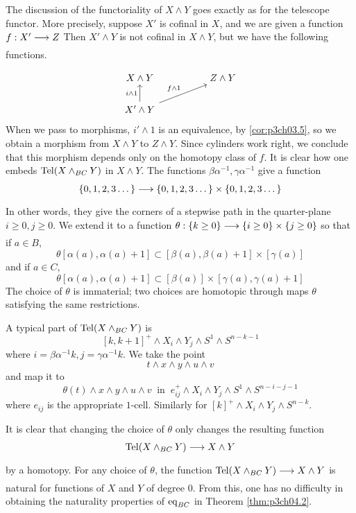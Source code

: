 \documentclass[../main]{subfiles}
\begin{document}
The discussion of the functoriality of $X\wedge Y$ goes exactly as for the telescope functor. More precisely, suppose $X'$ is cofinal in $X$, and we are given a function $f:X'\lar{}Z$ Then $X'\wedge Y$ is not cofinal in $X\wedge Y$, but we have the following functions.

\[\begin{tikzcd}
X\wedge Y && Z\wedge Y\\ X'\wedge Y \arrow[u,"i\wedge 1"] \arrow[urr, "f\wedge 1"]
\end{tikzcd}\]
When we pass to morphisms, $i'\wedge 1$ is an equivalence, by \ref{cor:p3ch03.5}, so we obtain a morphism from $X\wedge Y$ to $Z\wedge Y$. Since cylinders work right, we
conclude that this morphism depends only on the homotopy class of $f$. It is clear how one embeds $\mathrm{Tel}(X\wedge_{BC} Y)$ in $X\wedge Y$. The functions $\beta \alpha^{-1},\gamma \alpha^{-1}$ give a function \[\{0,1,2,3\dots\} \lar{}\{0,1,2,3\dots\}\times \{0,1,2,3\dots\} \]
In other words, they give the corners of a stepwise path in the quarter-plane $i\geq 0,j\geq 0$. We extend it to a function $\theta:\{k\geq 0\} \lar{} \{i\geq 0\}\times \{j\geq 0\}$ so that if $a\in B$,
\[\theta[\alpha(a),\alpha(a)+1]\subset [\beta(a),\beta(a)+1]\times [\gamma(a)] \]
and if $a\in C$,
\[ \theta[\alpha(a),\alpha(a)+1]\subset [\beta(a)]\times [\gamma(a),\gamma(a)+1] \]
The choice of $\theta$ is immaterial; two choices are homotopic through maps $\theta$ satisfying the same restrictions.

A typical part of $\mathrm{Tel}(X\wedge_{BC} Y)$ is 
\[[k,k+1]^+ \wedge X_i\wedge Y_j \wedge S^1 \wedge S^{n-k-1}\]
where $i=\beta \alpha^{-1} k, j=\gamma \alpha^{-1} k$. We take the point \[t\wedge x\wedge y\wedge u\wedge v\]
and map it to 
\[\theta(t)\wedge x\wedge y\wedge u\wedge v\ \text{ in } \  e_{ij}^+\wedge X_i \wedge Y_j \wedge S^1 \wedge S^{n-i-j-1}\]
where $e_{ij}$ is the appropriate $1$-cell. Similarly for $[k]^+ \wedge X_i \wedge Y_j \wedge S^{n-k}$.

It is clear that changing the choice of $\theta$ only changes the resulting function \[\te{Tel}(X\wedge_{BC} Y) \lar{} X\wedge Y \]
by a homotopy. For any choice of $\theta$, the function $\te{Tel}(X\wedge_{BC}Y)\lar{}X\wedge Y$ is natural for functions of $X$ and $Y$ of degree $0$. From this, one has no difficulty in obtaining the naturality properties of $\mathrm{eq}_{BC}$ in Theorem \ref{thm:p3ch04.2}.
\end{document}
